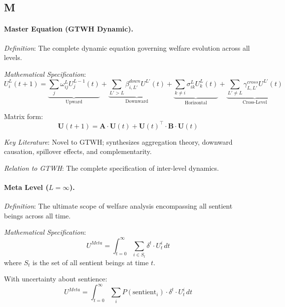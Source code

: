 \documentclass[12pt,a4paper]{article}
\begin{document}
\subsection*{M}

\paragraph{Master Equation (GTWH Dynamic).}
\textit{Definition}: The complete dynamic equation governing welfare evolution 
across all levels.

\textit{Mathematical Specification}:
\begin{equation}
\boxed{
U^L_i(t+1) = \underbrace{\sum_{j} \omega^L_{ij} U^{L-1}_j(t)}_{\text{Upward}} + 
\underbrace{\sum_{L'>L} \beta^{down}_{i,L'} U^{L'}(t)}_{\text{Downward}} + 
\underbrace{\sum_{k \neq i} \sigma^L_{ik} U^L_k(t)}_{\text{Horizontal}} + 
\underbrace{\sum_{L' \neq L} \gamma^{cross}_{L,L'} U^{L'}(t)}_{\text{Cross-Level}}
}
\end{equation}

Matrix form:
\begin{equation}
\mathbf{U}(t+1) = \mathbf{A} \cdot \mathbf{U}(t) + \mathbf{U}(t)^\top \cdot \mathbf{B} \cdot \mathbf{U}(t)
\end{equation}

\textit{Key Literature}: Novel to GTWH; synthesizes aggregation theory, 
downward causation, spillover effects, and complementarity.

\textit{Relation to GTWH}: The complete specification of inter-level dynamics.

\medskip

\paragraph{Meta Level ($L = \infty$).}
\textit{Definition}: The ultimate scope of welfare analysis encompassing all 
sentient beings across all time.

\textit{Mathematical Specification}:
\begin{equation}
U^{Meta} = \int_{t=0}^{\infty} \sum_{i \in S_t} \delta^t \cdot U^i_t \, dt
\end{equation}
where $S_t$ is the set of all sentient beings at time $t$.

With uncertainty about sentience:
\begin{equation}
U^{Meta} = \int_{t=0}^{\infty} \sum_{i} P(\text{sentient}_i) \cdot \delta^t \cdot U^i_t \, dt
\end{equation}
\end{document}
